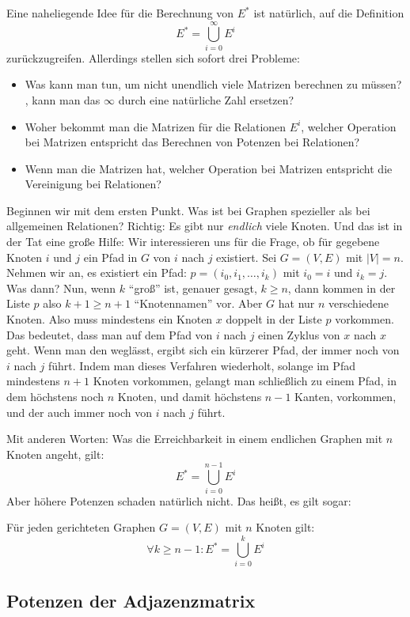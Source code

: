 Eine naheliegende Idee für die Berechnung von $E^*$ ist natürlich, auf
die Definition
\[
E^* = \bigcup_{i=0}^{\infty} E^i
\]
zurückzugreifen. Allerdings stellen sich sofort drei Probleme:
\begin{itemize}
\item Was kann man tun, um nicht unendlich viele Matrizen berechnen zu
  müssen? \Dh, kann man das $\infty$ durch eine natürliche Zahl
  ersetzen?
\item Woher bekommt man die Matrizen für die Relationen $E^i$, \dh
  welcher Operation bei Matrizen entspricht das Berechnen von Potenzen
  bei Relationen?
\item Wenn man die Matrizen hat, welcher Operation bei Matrizen
  entspricht die Vereinigung bei Relationen?
\end{itemize}
% 
Beginnen wir mit dem ersten Punkt. Was ist bei Graphen spezieller als
bei allgemeinen Relationen? Richtig: Es gibt nur \emph{endlich} viele
Knoten. Und das ist in der Tat eine große Hilfe: Wir interessieren uns
für die Frage, ob für gegebene Knoten $i$ und $j$ ein Pfad in $G$ von
$i$ nach $j$ existiert. Sei $G=(V,E)$ mit $|V|=n$.  Nehmen wir an, es
existiert ein Pfad: $p=(i_0, i_1, \dots, i_k)$ mit $i_0=i$ und
$i_k=j$. Was dann? Nun, wenn $k$ "`groß"' ist, genauer gesagt, $k\geq
n$, dann kommen in der Liste $p$ also $k+1\geq n+1$ "`Knotennamen"'
vor. Aber $G$ hat nur $n$ verschiedene Knoten. Also muss mindestens
ein Knoten $x$ doppelt in der Liste $p$ vorkommen. Das bedeutet, dass
man auf dem Pfad von $i$ nach $j$ einen Zyklus von $x$ nach $x$
geht. Wenn man den weglässt, ergibt sich ein kürzerer Pfad, der immer
noch von $i$ nach $j$ führt. Indem man dieses Verfahren wiederholt,
solange im Pfad mindestens $n+1$ Knoten vorkommen, gelangt man
schließlich zu einem Pfad, in dem höchstens noch $n$ Knoten, und damit
höchstens $n-1$ Kanten, vorkommen, und der auch immer noch von $i$
nach $j$ führt.

Mit anderen Worten: Was die Erreichbarkeit in einem endlichen Graphen
mit $n$ Knoten angeht, gilt:
\[
E^* = \bigcup_{i=0}^{n-1} E^i
\]
Aber höhere Potenzen schaden natürlich nicht. Das heißt, es gilt sogar:
%
\begin{lemma}
  \label{lem:e-stern-graphen}
  Für jeden gerichteten Graphen $G=(V,E)$ mit $n$ Knoten gilt:
  \[
  \forall k\geq n-1: E^* = \bigcup_{i=0}^{k} E^i
  \]
\end{lemma}


\Tut\subsection{Potenzen der Adjazenzmatrix}
\label{subsub:potenzen-adjazenz}


